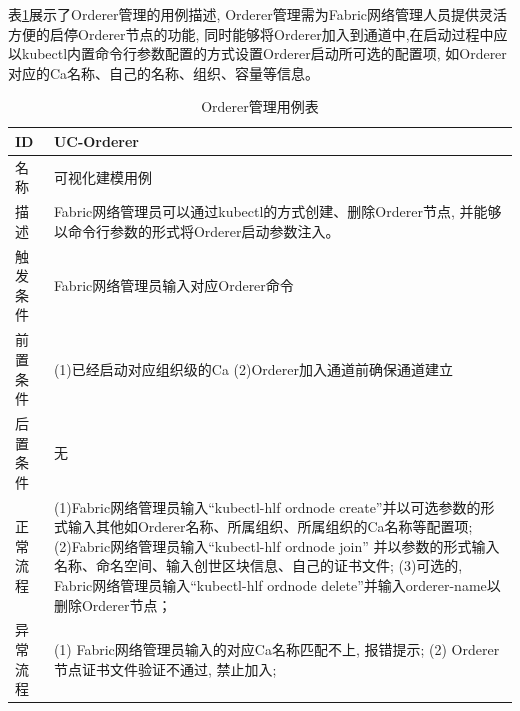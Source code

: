 表\ref{orderer_use_case}展示了Orderer管理的用例描述, Orderer管理需为Fabric网络管理人员提供灵活方便的启停Orderer节点的功能, 同时能够将Orderer加入到通道中,在启动过程中应以kubectl内置命令行参数配置的方式设置Orderer启动所可选的配置项, 如Orderer对应的Ca名称、自己的名称、组织、容量等信息。

{\footnotesize
\begin{longtable}[h]{m{60pt}|m{280pt}}
    \caption[Orderer管理用例表]{Orderer管理用例表} \label{orderer_use_case} \\
        \hline  
        ID&UC-Orderer\\
        \hline
        名称&可视化建模用例\\
        \hline
        描述&Fabric网络管理员可以通过kubectl的方式创建、删除Orderer节点, 并能够以命令行参数的形式将Orderer启动参数注入。\\
        \hline
        触发条件&Fabric网络管理员输入对应Orderer命令\\
        \hline
        前置条件& (1)已经启动对应组织级的Ca
        \newline (2)Orderer加入通道前确保通道建立\\
        \hline
        后置条件&无\\
        \hline
        正常流程& (1)Fabric网络管理员输入“kubectl-hlf ordnode create”并以可选参数的形式输入其他如Orderer名称、所属组织、所属组织的Ca名称等配置项;
        \newline (2)Fabric网络管理员输入“kubectl-hlf ordnode join” 并以参数的形式输入名称、命名空间、输入创世区块信息、自己的证书文件;
        \newline (3)可选的, Fabric网络管理员输入“kubectl-hlf ordnode delete”并输入orderer-name以删除Orderer节点；\\
        \hline 
        异常流程& (1) Fabric网络管理员输入的对应Ca名称匹配不上, 报错提示;
        \newline (2) Orderer节点证书文件验证不通过, 禁止加入; \\
        \hline
    \end{longtable} 
}


